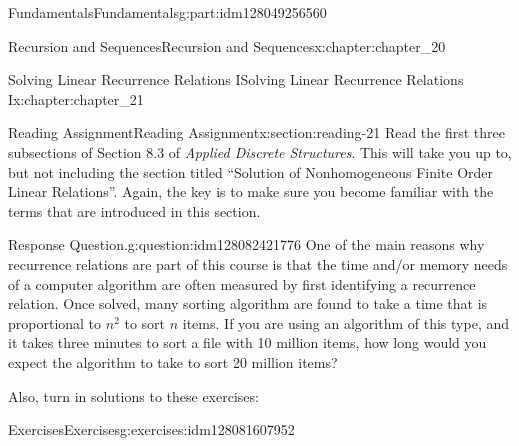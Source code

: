 \documentclass[oneside,10pt,]{book}
\numberwithin{equation}{section}
\newenvironment{codedisplay}
{\VerbatimEnvironment\begin{center}\begin{lrbox}{\codedisplaybox}\begin{BVerbatim}}
{\end{BVerbatim}\end{lrbox}\usebox{\codedisplaybox}\end{center}}
\begin{document}
\begin{partptx}{Fundamentals}{}{Fundamentals}{}{}{g:part:idm128049256560}
\begin{chapterptx}{Recursion and Sequences}{}{Recursion and Sequences}{}{}{x:chapter:chapter_20}
\end{chapterptx}
%
\typeout{************************************************}
\typeout{************************************************}
%
\begin{chapterptx}{Solving Linear Recurrence Relations I}{}{Solving Linear Recurrence Relations I}{}{}{x:chapter:chapter_21}
%
%
%
\typeout{************************************************}
\typeout{************************************************}
%
\begin{sectionptx}{Reading Assignment}{}{Reading Assignment}{}{}{x:section:reading-21}
Read the first three subsections of Section 8.3 of \emph{Applied Discrete Structures}.  This will take you up to, but not including the section titled ``Solution of Nonhomogeneous Finite Order Linear Relations''.   Again, the key is to make sure you become familiar with the terms that are introduced in this section.%
\begin{question}{Response Question.}{g:question:idm128082421776}%
One of the main reasons why recurrence relations are part of this course is that the time and\slash{}or memory needs of a computer algorithm are often measured by first identifying a recurrence relation.  Once solved, many sorting algorithm are found to take a time that is proportional to \(n^2\) to sort \(n\) items.  If you are using an algorithm of this type, and it takes three minutes to sort a file with 10 million items, how long would you expect the algorithm to take to sort 20 million items?%
\end{question}
Also, turn in solutions to these exercises:%
%
%
\typeout{************************************************}
\typeout{************************************************}
%
\begin{exercises-subsection}{Exercises}{}{Exercises}{}{}{g:exercises:idm128081607952}
\par\medskip\noindent%
%
\begin{exercisegroup}

\end{exercisegroup}
\end{exercises-subsection}
\end{sectionptx}
\end{chapterptx}
\end{partptx}
\end{document}
